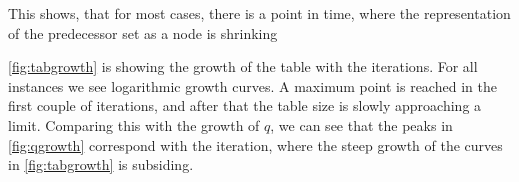 This shows, that for most cases, there is a point in time, where the representation of the predecessor set as a node is shrinking 

\bigbreak
\autoref{fig:tabgrowth} is showing the growth of the table with the iterations. For all instances we see logarithmic growth curves. A maximum point is reached in the first couple of iterations, and after that the table size is slowly approaching a limit. Comparing this with the growth of $q$, we can see that the peaks in 
\autoref{fig:qgrowth} correspond with the iteration, where the steep growth of the curves in \autoref{fig:tabgrowth} is subsiding.





%





